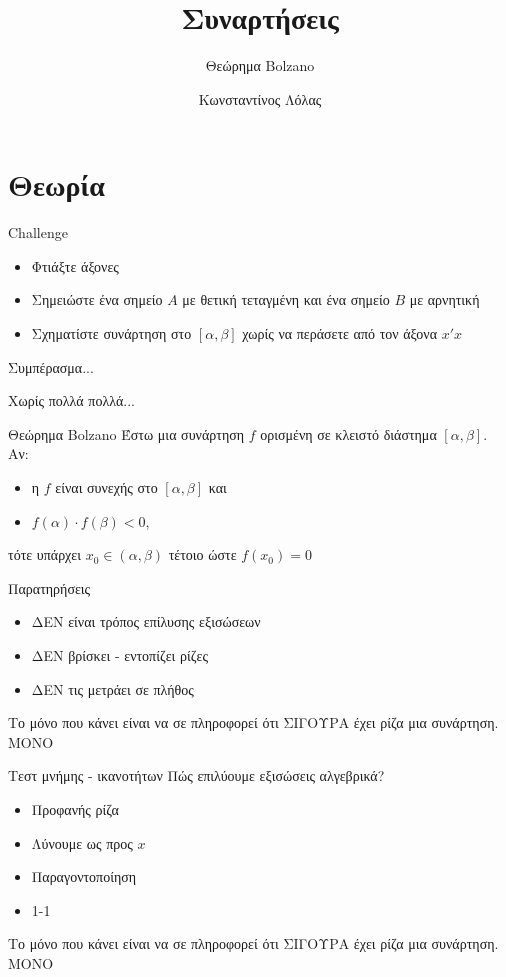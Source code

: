 \documentclass[greek]{beamer}
\title{Συναρτήσεις}
\subtitle{Θεώρημα Bolzano}
\author[Λόλας]{Κωνσταντίνος Λόλας}
\date{}
\begin{document}
\begin{frame}
 \titlepage
\end{frame}

\section{Θεωρία}
\begin{frame}{Challenge}
 \begin{itemize}
  \item Φτιάξτε άξονες \pause
  \item Σημειώστε ένα σημείο $Α$ με θετική τεταγμένη και ένα σημείο $Β$ με αρνητική \pause
  \item Σχηματίστε συνάρτηση στο $[α,β]$ χωρίς να περάσετε από τον άξονα $x'x$ \pause
 \end{itemize}
 Συμπέρασμα...
\end{frame}

\begin{frame}{Χωρίς πολλά πολλά...}
 \begin{block}{Θεώρημα Bolzano}
  Έστω μια συνάρτηση $f$ ορισμένη σε κλειστό διάστημα $[α,β]$. Αν:
  \begin{itemize}
   \item η $f$ είναι συνεχής στο $[α,β]$ και
   \item $f(α)\cdot f(β)<0$,
  \end{itemize}
  τότε υπάρχει $x_0\in (α,β)$ τέτοιο ώστε $f(x_0)=0$
 \end{block}
\end{frame}

\begin{frame}{Παρατηρήσεις}
 \begin{itemize}
  \item ΔΕΝ είναι τρόπος επίλυσης εξισώσεων \pause
  \item ΔΕΝ βρίσκει - εντοπίζει ρίζες \pause
  \item ΔΕΝ τις μετράει σε πλήθος \pause
 \end{itemize}
 Το μόνο που κάνει είναι να σε πληροφορεί ότι ΣΙΓΟΥΡΑ έχει ρίζα μια συνάρτηση. \pause ΜΟΝΟ
\end{frame}

\begin{frame}{Τεστ μνήμης - ικανοτήτων}
 Πώς επιλύουμε εξισώσεις αλγεβρικά?
 \begin{itemize}
  \item Προφανής ρίζα \pause
  \item Λύνουμε ως προς $x$ \pause
  \item Παραγοντοποίηση \pause
  \item 1-1 \pause
 \end{itemize}
 Το μόνο που κάνει είναι να σε πληροφορεί ότι ΣΙΓΟΥΡΑ έχει ρίζα μια συνάρτηση. \pause ΜΟΝΟ
\end{frame}
\end{document}
